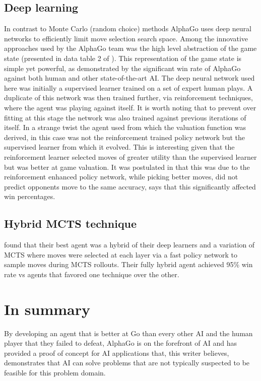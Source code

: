 \documentclass[11pt]{article}
\begin{document}
\subsection{Deep learning}
In contrast to Monte Carlo (random choice) methods AlphaGo uses deep neural networks\cite{alphago} to efficiently limit move selection search space. Among the innovative approaches used by the AlphaGo team was the  high level abstraction of the game state (presented in data table 2 of \cite{alphago}). This representation of the game state is simple yet powerful, as demonstrated by the significant win rate of AlphaGo against both human and other state-of-the-art AI.
The deep neural network used here was initially a supervised learner trained on a set of expert human plays. A duplicate of this network was then trained further, via reinforcement techniques, where the agent was playing against itself. It is worth noting that to prevent over fitting at this stage the network was also trained against previous iterations of itself. In a strange twist the agent used from which the valuation function was derived, in this case was not the reinforcement trained policy network but the supervised learner from which it evolved. This is interesting given that the reinforcement learner selected moves of greater utility than the supervised learner but was better at game valuation.
 It was postulated in \cite{alphago} that this was due to the reinforcement enhanced policy network, while picking better moves, did not predict opponents move to the same accuracy, \cite{alphago} says that this significantly affected win percentages.

\subsection{Hybrid MCTS technique}
\cite{alphago} found that their best agent was a hybrid of their deep learners and a variation of MCTS where moves were selected at each layer via a fast policy network to sample moves during MCTS rollouts. Their fully hybrid agent achieved 95\% win rate vs agents that favored one technique over the other.

\section{In summary}
By developing an agent that is better at Go than every other AI and the human player that they failed to defeat, AlphaGo is on the forefront of AI and has provided a proof of concept for AI applications that, this writer believes, demonstrates that AI can solve problems that are not typically suspected to be feasible for this problem domain.



\end{document}
